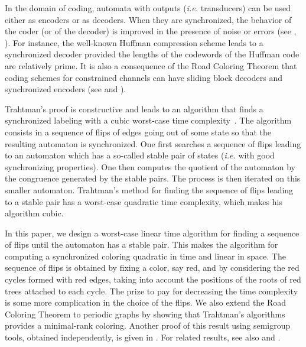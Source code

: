 \documentclass[11pt,a4paper]{article}
\newcommand{\ie}{{\itshape i.e.}\xspace }
\begin{document}
In the domain of coding, automata with outputs (\ie transducers) can
be used either as encoders or as decoders. When they are synchronized,
the behavior of the coder (or of the decoder) is improved in the
presence of noise or errors (see \cite{BerstelPerrinReutenauer2010},
\cite{Jurgensen2008}). For instance, the well-known Huffman
compression scheme leads to a synchronized decoder provided the
lengths of the codewords of the Huffman code are relatively prime.  It
is also a consequence of the Road Coloring Theorem that coding schemes
for constrained channels can have sliding block decoders and
synchronized encoders (see \cite{AdlerCoppersmithHassner83} and
\cite{LindMarcus95}).
 
Trahtman's proof is constructive and leads to an algorithm that finds
a synchronized labeling with a cubic worst-case time
complexity~\cite{Trahtman09,Trahtman2011}. The algorithm consists in
a sequence of flips of edges going out of some state so that the
resulting automaton is synchronized. One first searches a sequence of
flips leading to an automaton which has a so-called stable pair of
states (\ie with good synchronizing properties). One then
computes the quotient of the automaton by the congruence generated by
the stable pairs. The process is then iterated on this smaller
automaton. Trahtman's method for finding the sequence of flips leading
to a stable pair has a worst-case quadratic time complexity, which
makes his algorithm cubic.

In this paper, we design a worst-case linear time algorithm for
finding a sequence of flips until the automaton has a stable pair.
This makes the algorithm for computing a synchronized coloring
quadratic in time and linear in space.  The sequence of flips is
obtained by fixing a color, say red, and by considering the red cycles
formed with red edges, taking into account the positions of the roots
of red trees attached to each cycle. The prize to pay for decreasing
the time complexity is some more complication in the choice of the
flips. We also extend the Road Coloring Theorem to periodic graphs by
showing that Trahtman's algorithms provides a minimal-rank coloring.
Another proof of this result using semigroup tools, obtained
independently, is given in \cite{BudzbanFeinsilver11}. For related
results, see also \cite{Trahtman2010} and \cite{JonoskaKarl1999}.
\end{document}
